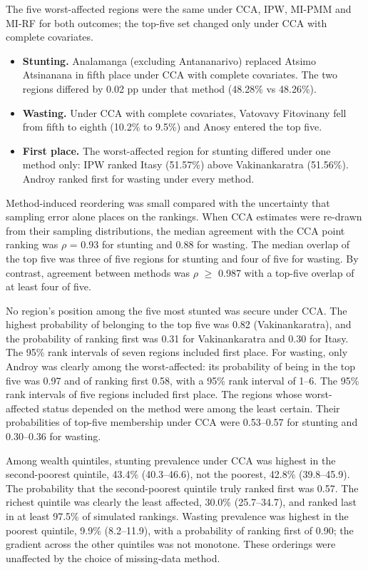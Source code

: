 \documentclass[11pt,a4paper]{article}
\providecommand{\tightlist}{\setlength{\itemsep}{0pt}\setlength{\parskip}{0pt}}
\begin{document}
The five worst-affected regions were the same under CCA, IPW, MI-PMM and
MI-RF for both outcomes; the top-five set changed only under CCA with
complete covariates.

\begin{itemize}
\tightlist
\item
  \textbf{Stunting.} Analamanga (excluding Antananarivo) replaced Atsimo
  Atsinanana in fifth place under CCA with complete covariates. The two
  regions differed by 0.02 pp under that method (48.28\% vs 48.26\%).
\item
  \textbf{Wasting.} Under CCA with complete covariates, Vatovavy
  Fitovinany fell from fifth to eighth (10.2\% to 9.5\%) and Anosy
  entered the top five.
\item
  \textbf{First place.} The worst-affected region for stunting differed
  under one method only: IPW ranked Itasy (51.57\%) above Vakinankaratra
  (51.56\%). Androy ranked first for wasting under every method.
\end{itemize}

Method-induced reordering was small compared with the uncertainty that
sampling error alone places on the rankings. When CCA estimates were
re-drawn from their sampling distributions, the median agreement with
the CCA point ranking was $\rho$ = 0.93 for stunting and 0.88 for wasting.
The median overlap of the top five was three of five regions for
stunting and four of five for wasting. By contrast, agreement between
methods was $\rho$ $\ge$ 0.987 with a top-five overlap of at least four of five.

No region's position among the five most stunted was secure under CCA.
The highest probability of belonging to the top five was 0.82
(Vakinankaratra), and the probability of ranking first was 0.31 for
Vakinankaratra and 0.30 for Itasy. The 95\% rank intervals of seven
regions included first place. For wasting, only Androy was clearly among
the worst-affected: its probability of being in the top five was 0.97
and of ranking first 0.58, with a 95\% rank interval of 1--6. The 95\%
rank intervals of five regions included first place. The regions whose
worst-affected status depended on the method were among the least
certain. Their probabilities of top-five membership under CCA were
0.53--0.57 for stunting and 0.30--0.36 for wasting.

Among wealth quintiles, stunting prevalence under CCA was highest in the
second-poorest quintile, 43.4\% (40.3--46.6), not the poorest, 42.8\%
(39.8--45.9). The probability that the second-poorest quintile truly
ranked first was 0.57. The richest quintile was clearly the least
affected, 30.0\% (25.7--34.7), and ranked last in at least 97.5\% of
simulated rankings. Wasting prevalence was highest in the poorest
quintile, 9.9\% (8.2--11.9), with a probability of ranking first of
0.90; the gradient across the other quintiles was not monotone. These
orderings were unaffected by the choice of missing-data method.
\end{document}
